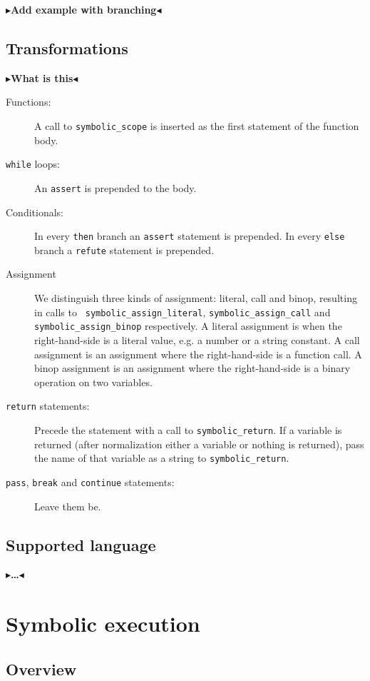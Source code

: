 \documentclass[11pt]{report}
\newcommand{\todo}[1]{{\color[rgb]{.5,0,0}\textbf{$\blacktriangleright$#1$\blacktriangleleft$}}}
\begin{document}
\todo{Add example with branching}

\section{Transformations}
\todo{What is this}

\begin{description}
  \item[Functions:] A call to {\tt symbolic\_scope} is inserted as the
    first statement of the function body.
  \item[{\tt while} loops:] An {\tt assert} is prepended to the body.
  \item[Conditionals:] In every {\tt then} branch an {\tt assert}
    statement is prepended. In every {\tt else} branch a {\tt refute}
    statement is prepended.
  \item[Assignment] We distinguish three kinds of assignment: literal,
    call and binop, resulting in calls to {\tt
      symbolic\_assign\_literal}, {\tt symbolic\_assign\_call} and
    {\tt symbolic\_assign\_binop} respectively. A literal assignment
    is when the right-hand-side is a literal value, e.g. a number or a
    string constant. A call assignment is an assignment where the
    right-hand-side is a function call. A binop assignment is an
    assignment where the right-hand-side is a binary operation on two
    variables.
  \item[{\tt return} statements:] Precede the statement with a call to
    {\tt symbolic\_return}. If a variable is returned (after
    normalization either a variable or nothing is returned), pass the
    name of that variable as a string to {\tt symbolic\_return}.
  \item[{\tt pass}, {\tt break} and {\tt continue} statements:] Leave
    them be.
\end{description}

\section{Supported language}
\todo{\dots}

\chapter{Symbolic execution}
\label{ch:symbolic}

\section{Overview}
\end{document}

